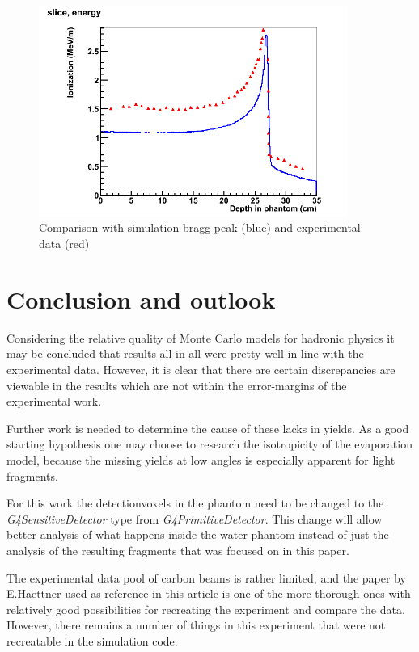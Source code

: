\begin{figure}[h] 
\begin{center}
\includegraphics[width=0.9\textwidth]{images/plots/braggPeak/braggPeakComparisonToData.png}  
\caption{\label{fig:braggPeakCompared} Comparison with simulation bragg peak (blue) and experimental data (red)}
 \end{center}
 \end{figure}

\clearpage
\section{Conclusion and outlook}
Considering the relative quality of Monte Carlo models for hadronic physics it may be concluded that results all in all were pretty well in line with the experimental data. However, it is clear that there are certain discrepancies are viewable in the results which are not within the error-margins of the experimental work.

Further work is needed to determine the cause of these lacks in yields. As a good starting hypothesis one may choose to research the isotropicity of the evaporation model, because the missing yields at low angles is especially apparent for light fragments.

For this work the detectionvoxels in the phantom need to be changed to the \textit{G4SensitiveDetector} type from \textit{G4PrimitiveDetector}. This change will allow better analysis of what happens inside the water phantom instead of just the analysis of the resulting fragments that was focused on in this paper.

The experimental data pool of carbon beams is rather limited, and the paper by E.Haettner used as reference in this article is one of the more thorough ones with relatively good possibilities for recreating the experiment and compare the data. However, there remains a number of things in this experiment that were not recreatable in the simulation code.


